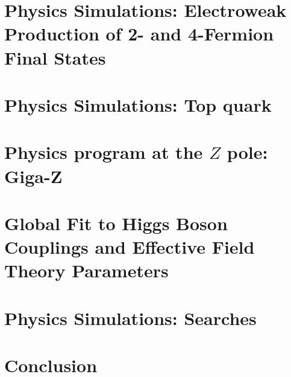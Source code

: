 \documentclass[%
reprint,
nofootinbib,
 amsmath,amssymb,
 aps,
]{revtex4-1}
\begin{document}
\section{\label{sec:ew}Physics Simulations: Electroweak Production of 2- and 4-Fermion Final States }



  
  



\section{\label{sec:top}Physics Simulations: Top quark}

  
  


\section{\label{sec:gigaz} Physics program at the $Z$ pole:  Giga-Z}


 
  
  


\section{\label{sec:global}Global Fit to Higgs Boson Couplings and Effective Field Theory Parameters}

  



\section{\label{sec:searches}Physics Simulations: Searches }


 
  
 

\section{\label{sec:conclusion}Conclusion}




%

\end{document}
